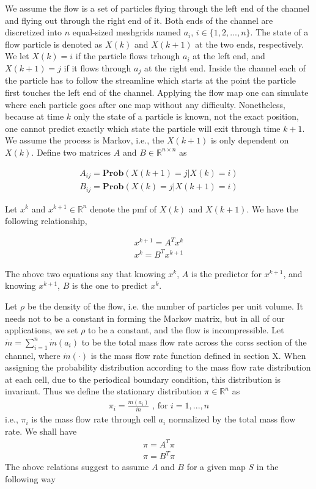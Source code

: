 \documentclass{article}
\begin{document}
We assume the flow is a set of particles flying through the left end of the channel and flying out through the right end of it. Both ends of the channel are discretized into $n$ equal-sized meshgrids named $a_i$, $i \in \{1,2,...,n\}$. The state of a flow particle is denoted as $X(k)$ and $X(k+1)$ at the two ends, respectively. We let $X(k) = i$ if the particle flows trhough $a_i$ at the left end, and $X(k+1) = j$ if it flows through $a_j$ at the right end. Inside the channel each of the particle has to follow the streamline which starts at the point the particle first touches the left end of the channel. Applying the flow map one can simulate where each particle goes after one map without any difficulty. Nonetheless, because at time $k$ only the state of a particle is known, not the exact position, one cannot predict exactly which state the particle will exit through time $k+1$. We assume the process is Markov, i.e., the $X(k+1)$ is only dependent on $X(k)$.  Define two matrices $A$ and $B \in \mathbb{R}^{n \times n}$ as

\begin{eqnarray}
  A_{ij} = \mathbf{Prob}\left(X(k+1)=j | X(k) = i \right)\\
  B_{ij} = \mathbf{Prob}\left(X(k)=j | X(k+1) = i \right) 
\end{eqnarray}

Let $x^k$ and $x^{k+1}  \in \mathbb{R}^n$ denote the pmf of $X(k)$ and $X(k+1)$. We have the following relationship, 

\begin{eqnarray}
\label{xevolve}
  x^{k+1} = A^T x^k\\
  x^{k} = B^T x^{k+1} 
\end{eqnarray}

The above two equations say that knowing $x^{k}$, $A$ is the predictor for $x^{k+1}$, and knowing $x^{k+1}$, $B$ is the one to predict $x^{k}$. 


Let $\rho$ be the density of the flow, i.e. the number of particles per unit volume. It needs not to be a constant in forming the Markov matrix, but in all of our applications, we set $\rho$ to be a constant, and the flow is incompressible. Let $\dot{m} = \sum_{i=1}^{n}\dot{m}(a_i) $ to be the total mass flow rate across the corss section of the channel, where $\dot{m}(\cdot)$ is the mass flow rate function defined in section X. When assigning the probability distribution according to the mass flow rate distribution at each cell, due to the periodical boundary condition, this distribution is invariant. Thus we define the stationary distribution $\pi \in \mathbb{R}^{n}$ as
  \begin{eqnarray*}
    \pi_{i} = \frac{\dot{m}(a_i)}{\dot{m}} \mbox{   , for } i = 1,...,n
  \end{eqnarray*}
i.e., $\pi_{i}$ is the mass flow rate through cell $a_i$ normalized by the total mass flow rate. We shall have
  \begin{eqnarray}
  \label{stationary distribution relation}
    \pi = A^T \pi \nonumber \\
    \pi = B^T \pi 
  \end{eqnarray}   
The above relations suggest to assume $A$ and $B$ for a given map $S$ in the following way
\end{document}
